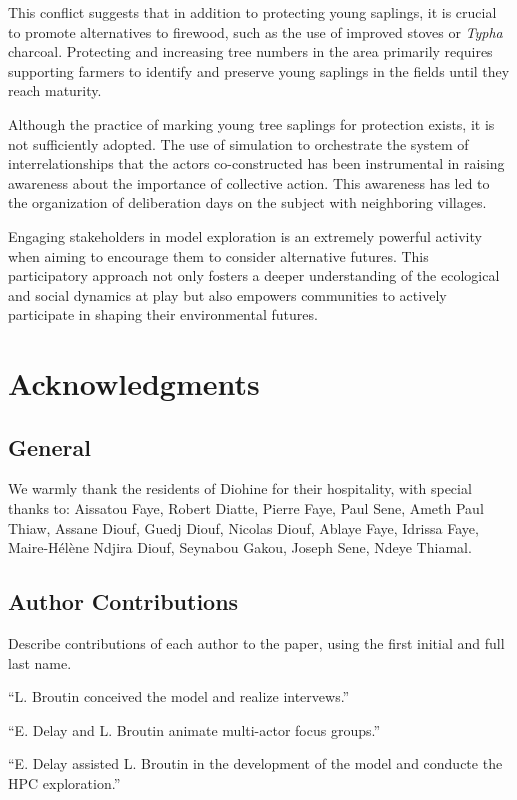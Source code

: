 \documentclass{article}
\begin{document}
This conflict suggests that in addition to protecting young saplings, it is crucial to promote alternatives to firewood, such as the use of improved stoves or \textit{Typha} charcoal. Protecting and increasing tree numbers in the area primarily requires supporting farmers to identify and preserve young saplings in the fields until they reach maturity.

Although the practice of marking young tree saplings for protection exists, it is not sufficiently adopted. The use of simulation to orchestrate the system of interrelationships that the actors co-constructed has been instrumental in raising awareness about the importance of collective action. This awareness has led to the organization of deliberation days on the subject with neighboring villages.

Engaging stakeholders in model exploration is an extremely powerful activity when aiming to encourage them to consider alternative futures. This participatory approach not only fosters a deeper understanding of the ecological and social dynamics at play but also empowers communities to actively participate in shaping their environmental futures.

\section*{Acknowledgments}

\subsection*{General} 
We warmly thank the residents of Diohine for their hospitality, with special thanks to: Aissatou Faye, Robert Diatte, Pierre Faye, Paul Sene, Ameth Paul Thiaw, Assane Diouf, Guedj Diouf, Nicolas Diouf, Ablaye Faye, Idrissa Faye, Maire-Hélène Ndjira Diouf, Seynabou Gakou, Joseph Sene, Ndeye Thiamal.

\subsection*{Author Contributions} 
Describe contributions of each author to the paper, using the first initial and full last name. 

``L. Broutin conceived the model and realize intervews.''

``E. Delay and L. Broutin animate multi-actor focus groups.''

``E. Delay assisted L. Broutin in the development of the model and conducte the HPC exploration.''
\end{document}
